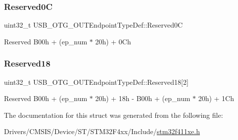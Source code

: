 \subsubsection{\texorpdfstring{Reserved0C}{Reserved0C}}
{\footnotesize\ttfamily uint32\+\_\+t U\+S\+B\+\_\+\+O\+T\+G\+\_\+\+O\+U\+T\+Endpoint\+Type\+Def\+::\+Reserved0C}

Reserved B00h + (ep\+\_\+num $\ast$ 20h) + 0\+Ch \mbox{\label{struct_u_s_b___o_t_g___o_u_t_endpoint_type_def_a51b162457add1bb7cc254b7aeb9f94bd}} 
\subsubsection{\texorpdfstring{Reserved18}{Reserved18}}
{\footnotesize\ttfamily uint32\+\_\+t U\+S\+B\+\_\+\+O\+T\+G\+\_\+\+O\+U\+T\+Endpoint\+Type\+Def\+::\+Reserved18\mbox{[}2\mbox{]}}

Reserved B00h + (ep\+\_\+num $\ast$ 20h) + 18h -\/ B00h + (ep\+\_\+num $\ast$ 20h) + 1\+Ch 

The documentation for this struct was generated from the following file\+:\begin{DoxyCompactItemize}
\item 
Drivers/\+C\+M\+S\+I\+S/\+Device/\+S\+T/\+S\+T\+M32\+F4xx/\+Include/\hyperlink{stm32f411xe_8h}{stm32f411xe.\+h}\end{DoxyCompactItemize}
